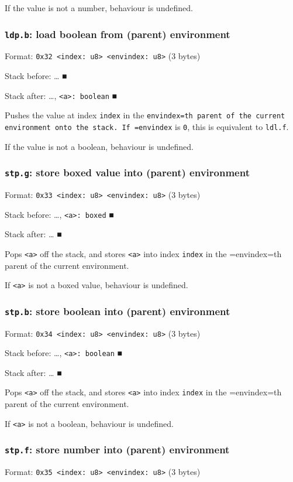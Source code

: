 If the value is not a number, behaviour is undefined.

\subsubsection{\texttt{ldp.b}: load boolean from (parent) environment}
\label{sec:org74003ff}
Format: \texttt{0x32 <index: u8> <envindex: u8>} (3 bytes)

Stack before: \ldots{}​ ■

Stack after: \ldots{}​, \texttt{<a>: boolean} ■

Pushes the value at index \texttt{index} in the \texttt{envindex=th parent of the
current environment onto the stack. If =envindex} is \texttt{0}, this is
equivalent to \texttt{ldl.f}.

If the value is not a boolean, behaviour is undefined.

\subsubsection{\texttt{stp.g}: store boxed value into (parent) environment}
\label{sec:org3861b91}
Format: \texttt{0x33 <index: u8> <envindex: u8>} (3 bytes)

Stack before: \ldots{}​, \texttt{<a>: boxed} ■

Stack after: \ldots{}​ ■

Pops \texttt{<a>} off the stack, and stores \texttt{<a>} into index \texttt{index} in the
=envindex=th parent of the current environment.

If \texttt{<a>} is not a boxed value, behaviour is undefined.

\subsubsection{\texttt{stp.b}: store boolean into (parent) environment}
\label{sec:org15feb28}
Format: \texttt{0x34 <index: u8> <envindex: u8>} (3 bytes)

Stack before: \ldots{}​, \texttt{<a>: boolean} ■

Stack after: \ldots{}​ ■

Pops \texttt{<a>} off the stack, and stores \texttt{<a>} into index \texttt{index} in the
=envindex=th parent of the current environment.

If \texttt{<a>} is not a boolean, behaviour is undefined.

\subsubsection{\texttt{stp.f}: store number into (parent) environment}
\label{sec:org4696eef}
Format: \texttt{0x35 <index: u8> <envindex: u8>} (3 bytes)

